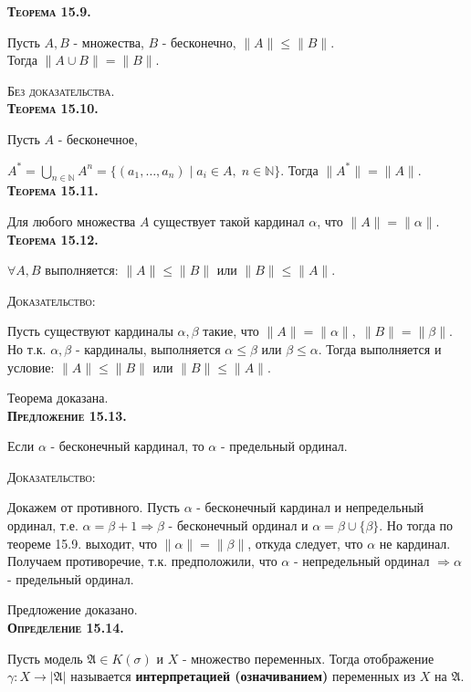\documentclass[18pt, a4paper]{extarticle}
\newcommand{\bezdok}{\textsc{Без доказательства.}}
\begin{document}
\textbf{\textsc{Теорема 15.9.}} 

Пусть $A,B$ -  множества, $B$ -  бесконечно, $\|A\|\leqslant\|B\|$. \\Тогда $\|A\cup B\|=\|B\|$.

\bezdok\\

\textbf{\textsc{Теорема 15.10.}} 

Пусть $A$ -  бесконечное,

$A^*=\underset{n\in \mathbb N}{\bigcup}A^n=\{(a_1,\dots,a_n)\;|\;a_i\in A,\;n\in \mathbb N\}$. Тогда $\|A^*\|=\|A\|$.\\

\textbf{\textsc{Теорема 15.11.}} 

Для любого множества $A$ существует такой кардинал $\alpha$, что $\|A\|=\|\alpha\|$.\\

\textbf{\textsc{Теорема 15.12.}} 

$\forall A,B$ выполняется: $\|A\|\leqslant\|B\|$ или $\|B\|\leqslant\|A\|$.

\textsc{Доказательство:}

Пусть существуют кардиналы $\alpha,\beta$ такие, что $\|A\|=\|\alpha\|,\;\|B\|=\|\beta\|$. Но т.к. $\alpha,\beta$ -  кардиналы, выполняется $\alpha\leqslant\beta$ или $\beta\leqslant\alpha$. Тогда выполняется и условие: $\|A\|\leqslant\|B\|$ или $\|B\|\leqslant\|A\|$. 

Теорема доказана.\\

\textbf{\textsc{Предложение 15.13.}} 

Если $\alpha$ - бесконечный кардинал, то $\alpha$ - предельный ординал.

\textsc{Доказательство:}

Докажем от противного. Пусть $\alpha$ - бесконечный кардинал и непредельный ординал, т.е. $\alpha=\beta+1\Rightarrow\beta$ - бесконечный ординал и $\alpha=\beta\cup\{\beta\}$. Но тогда по теореме 15.9. выходит, что $\|\alpha\|=\|\beta\|$, откуда следует, что $\alpha$ не кардинал. Получаем противоречие, т.к. предположили, что $\alpha$ - непредельный ординал $\Rightarrow\alpha$ - предельный ординал.

Предложение доказано.\\

\textbf{\textsc{Определение 15.14.}} 

Пусть модель $\mathfrak{A}\in K(\sigma)$ и $X$ -  множество переменных. Тогда отображение $\gamma:X\to|\mathfrak{A}|$ называется \textbf{интерпретацией (означиванием)} переменных из $X$ на $\mathfrak{A}$. 
\end{document}
